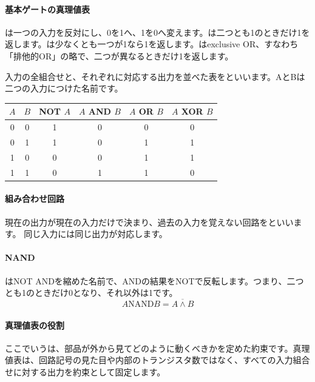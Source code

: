 \begingroup
\begingroup
\begin{samepage}
\paragraph{基本ゲートの真理値表}
        は一つの入力を反対にし、0を1へ、1を0へ変えます。は二つとも1のときだけ1を返します。は少なくとも一つが1なら1を返します。はexclusive OR、すなわち「排他的OR」の略で、二つが異なるときだけ1を返します。

        入力の全組合せと、それぞれに対応する出力を並べた表をといいます。AとBは二つの入力につけた名前です。
        \par\smallskip
        \begin{center}
        \begin{tabular}{cccccc}
          \toprule
          $A$ & $B$ & NOT $A$ & $A$ AND $B$ & $A$ OR $B$ & $A$ XOR $B$\\
          \midrule
          0 & 0 & 1 & 0 & 0 & 0\\
          0 & 1 & 1 & 0 & 1 & 1\\
          1 & 0 & 0 & 0 & 1 & 1\\
          1 & 1 & 0 & 1 & 1 & 0\\
          \bottomrule
        \end{tabular}
        \end{center}
\end{samepage}

\paragraph{組み合わせ回路}
        現在の出力が現在の入力だけで決まり、過去の入力を覚えない回路をといいます。
        同じ入力には同じ出力が対応します。

\par
\endgroup
\medskip
\begingroup
\paragraph{NAND}
        はNOT ANDを縮めた名前で、ANDの結果をNOTで反転します。つまり、二つとも1のときだけ0となり、それ以外は1です。
        \[
          A\mathbin{\mathrm{NAND}}B=\overline{A\land B}
        \]

\paragraph{真理値表の役割}
        ここでいうは、部品が外から見てどのように動くべきかを定めた約束です。真理値表は、回路記号の見た目や内部のトランジスタ数ではなく、すべての入力組合せに対する出力を約束として固定します。

